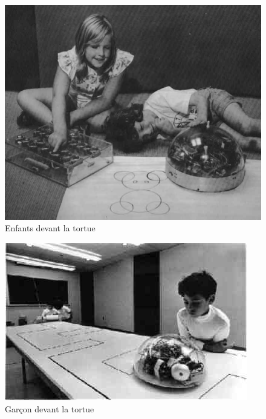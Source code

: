\begin{minipage}[H]{0.5\linewidth}
  \begin{figure}[H]
  \centering
  \includegraphics[width=\textwidth]{../resources/illustrations/logo_turtle_2}
  \caption{Enfants devant la tortue}
  \end{figure}
\end{minipage}
\begin{minipage}[H]{0.5\linewidth}
  \begin{figure}[H]
  \centering
  \includegraphics[width=\textwidth]{../resources/illustrations/logo_turtle_3}
  \caption{Garçon devant la tortue}
  \end{figure}
\end{minipage}

